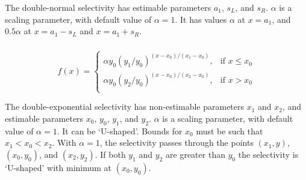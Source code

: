 The double-normal selectivity has estimable parameters $a_1$, $s_L$, and $s_R$. $\alpha$ is a scaling parameter, with default value of $\alpha = 1$. It has values $\alpha$ at $x=a_1$, and $0.5 \alpha$ at $x=a_1-s_L$ and $x=a_1+s_R$. 

\subsubsection[Double-exponential]{}

\begin{equation} 
f(x)=\begin{cases}
	  \alpha y_0(y_1 / y_0)^{(x-x_0)/(x_1-x_0)}, & \text{if $x \le x_0$} \\
	  \alpha y_0(y_2 / y_0)^{(x-x_0)/(x_2-x_0)}, & \text{if $x > x_0$} \\
  \end{cases}
\end{equation}

The double-exponential selectivity has non-estimable parameters $x_1$ and $x_2$, and estimable parameters $x_0$, $y_0$, $y_1$, and $y_2$.  $\alpha$ is a scaling parameter, with default value of $\alpha = 1$. It can be `U-shaped'. Bounds for $x_0$ must be such that $x_1 < x_0 < x_2$. With $\alpha=1$, the selectivity passes through the points $(x_1, y)$, $(x_0, y_0)$, and $(x_2, y_2)$. If both $y_1$ and $y_2$ are greater than $y_0$ the selectivity is `U-shaped' with minimum at $(x_0, y_0)$.

